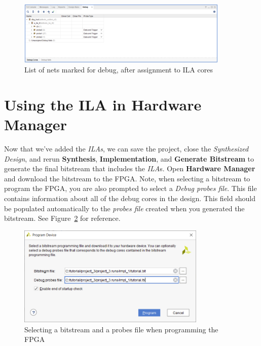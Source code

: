 \documentclass[11pt]{article}
\begin{document}
\begin{figure}[!h]
    \centering
    \includegraphics[width=0.9\textwidth]{images/debug_list2.png}
    \caption{List of nets marked for debug, after assignment to ILA cores}
    \label{fig:debug_list2}
\end{figure}




\section{Using the ILA in Hardware Manager}
\label{sec:hw_man}
Now that we've added the \textit{ILAs}, we can save the project, close the \textit{Synthesized Design}, and rerun \textbf{Synthesis}, \textbf{Implementation}, and \textbf{Generate Bitstream} to generate the final bitstream that includes the \textit{ILA}s. Open \textbf{Hardware Manager} and download the bitstream to the FPGA. Note, when selecting a bitstream to program the FPGA, you are also prompted to select a \textit{Debug probes file}. This file contains information about all of the debug cores in the design. This field should be populated automatically to the \textit{probes file} created when you generated the bitstream. See Figure~\ref{fig:select_bit} for reference.

\begin{figure}[!h]
    \centering
    \includegraphics[width=0.8\textwidth]{images/select_bit.png}
    \caption{Selecting a bitstream and a probes file when programming the FPGA}
    \label{fig:select_bit}
\end{figure}
\end{document}
